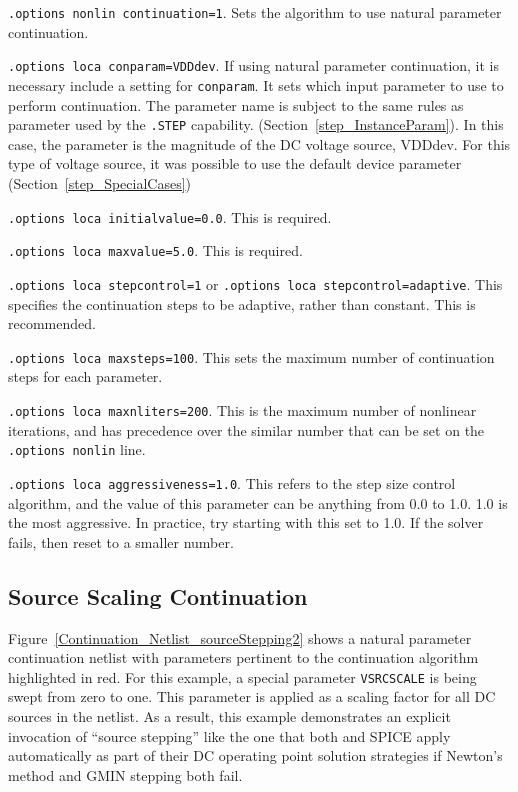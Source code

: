 \begin{XyceItemize}
\item \texttt{.options nonlin continuation=1}.  Sets the algorithm to use natural
parameter continuation.
\item \texttt{.options loca conparam=VDDdev}.  If using natural parameter continuation, it is necessary include a setting for \texttt{conparam}.  It sets which input parameter to use to perform continuation.  The parameter name is subject to the same rules as parameter used by the \texttt{.STEP} capability. (Section~\ref{step_InstanceParam}).  In this case, the parameter is the
magnitude of the DC voltage source, VDDdev.  For this type of voltage
source, it was possible to use the default device parameter (Section~\ref{step_SpecialCases})
\item \texttt{.options loca initialvalue=0.0}.  This is required.
\item \texttt{.options loca maxvalue=5.0}.  This is required.
\item \texttt{.options loca stepcontrol=1} or \texttt{.options loca stepcontrol=adaptive}.  This specifies the continuation steps to be adaptive, rather than constant.  This is recommended.
\item \texttt{.options loca maxsteps=100}.  This sets the maximum number of continuation 
steps for each parameter.  
\item \texttt{.options loca maxnliters=200}.  This is the maximum number of nonlinear 
iterations, and has precedence over the similar number that can be set on
the \texttt{.options nonlin} line.
\item \texttt{.options loca aggressiveness=1.0}.  This refers to the step size 
control algorithm,
and the value of this parameter can be anything from 0.0 to 1.0.  1.0 is
the most aggressive.  In practice, try starting with this set to 1.0. 
If the solver fails, then reset to a smaller number.
\end{XyceItemize}

\subsection{Source Scaling Continuation}
\label{continuation_scaling}

Figure~\ref{Continuation_Netlist_sourceStepping2} shows a natural
parameter continuation netlist with parameters pertinent to the
continuation algorithm highlighted in red.  For this example, a
special parameter \texttt{VSRCSCALE} is being swept from zero to one.
This parameter is applied as a scaling factor for all DC 
sources in the netlist.  As a result, this example demonstrates an
explicit invocation of ``source stepping'' like the one that both
\Xyce{} and SPICE apply automatically as part of their DC operating
point solution strategies if Newton's method and GMIN stepping both
fail.

